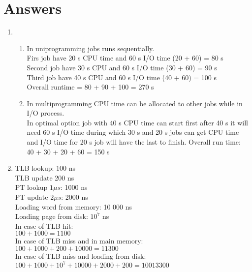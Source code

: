 \documentclass[12pt]{article}
\begin{document}
    \section*{Answers}
    \begin{enumerate}
        \item
        \begin{enumerate}
            \item In uniprogramming jobs runs sequentially.\\
            Firs job have 20 s CPU time and 60 s I/O time  (20 + 60) = 80 s\\
            Second job have 30 s CPU and 60 s I/O time (30 + 60) = 90 s\\
            Third job have 40 s CPU and 60 s I/O time (40 + 60) = 100 s\\
            Overall runtime = 80 + 90 + 100 = 270 s
            \item In multiprogramming CPU time can be allocated to other jobs while in I/O process.\\
            In optimal option job with 40 s CPU time can start first after 40 s it will need 60 s I/O time during which 30 s and 20 s jobs can get CPU time and I/O time for 20 s job will have the last to finish.
            Overall run time:\\
            40 + 30 + 20 + 60 = 150 s 
            
        \end{enumerate}


        \item 
        TLB lookup: 100 ns\\
        TLB update 200 ns\\
        PT lookup $1 \mu s$: 1000 ns\\
        PT update $2 \mu s$: 2000 ns\\
        Loading word from memory: 10 000 ns\\
        Loading page from disk: $10^{7}$ ns\\

        In case of TLB hit:\\
        $100 + 1000 = 1100$\\

        In case of TLB miss and in main memory:\\
        $100 + 1000 + 200 + 10 000 = 11 300$\\

        In case of TLB miss and loading from disk:\\
        $100 + 1000 + 10^{7} + 10000 + 2000 + 200 = 10013300$


\end{enumerate}
\end{document}
